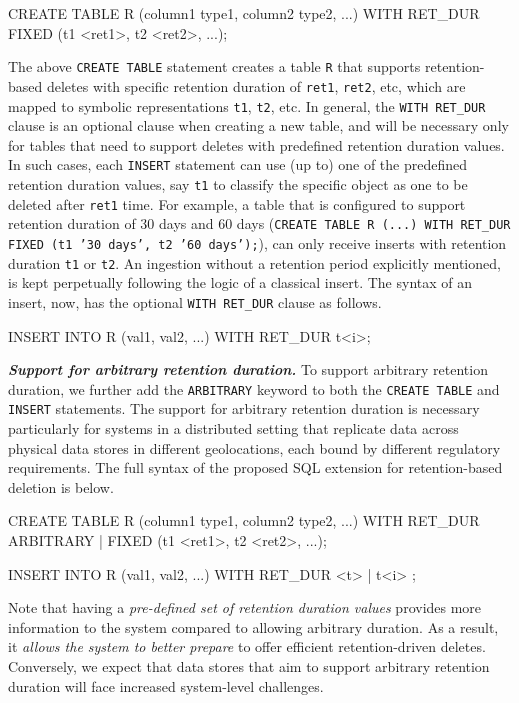 \documentclass[11pt,dvipdfmx]{article}
\newcommand\Paragraphbit[1]{\vspace{0.02in}  \noindent \textbf{\textit{#1.}}}
\begin{document}
\begin{verbnobox}[\fontsize{9pt}{10pt}\selectfont]
    CREATE TABLE R (column1 type1, column2 type2, ...) 
    WITH RET_DUR FIXED (t1 <ret1>, t2 <ret2>, ...);
\end{verbnobox}
The above \texttt{CREATE TABLE} statement creates a table \texttt{R} that supports 
retention-based deletes with specific retention duration of \texttt{ret1}, 
\texttt{ret2}, etc, which are mapped to symbolic representations \texttt{t1}, 
\texttt{t2}, etc.
In general, the \texttt{WITH RET\_DUR} clause is an optional clause when creating
a new table, and will be necessary only for tables that need to support deletes with 
predefined retention duration values. In such cases, each \texttt{INSERT} statement can use 
(up to) one of the predefined retention duration values, say \texttt{t1} to classify the 
specific object as one to be deleted after \texttt{ret1} time.
For example, a table that is configured to support retention duration of 30 days and 60 days (\texttt{CREATE TABLE R (...) WITH RET\_DUR FIXED (t1 '30 days', t2 '60 days');}), 
can only receive inserts with retention duration \texttt{t1} or \texttt{t2}.
An ingestion without a retention period explicitly mentioned, is kept perpetually 
following the logic of a classical insert. 
The syntax of an insert, now, has the 
optional \texttt{WITH RET\_DUR} clause as follows.
\begin{verbnobox}[\fontsize{9pt}{10pt}\selectfont]
 INSERT INTO R (val1, val2, ...) WITH RET_DUR t<i>;
\end{verbnobox}


\Paragraphbit{Support for arbitrary retention duration}
To support arbitrary retention duration, we further add the \texttt{ARBITRARY} 
keyword to both the \texttt{CREATE TABLE} and \texttt{INSERT} statements.
The support for arbitrary retention duration is necessary particularly for systems
in a distributed setting that replicate data across physical data stores in different 
geolocations, each bound by different regulatory requirements. 
The full syntax of the proposed SQL extension for retention-based deletion is below.
\begin{verbnobox}[\fontsize{9pt}{10pt}\selectfont]
 CREATE TABLE R (column1 type1, column2 type2, ...) 
 WITH RET_DUR {ARBITRARY | FIXED (t1 <ret1>, t2 <ret2>, ...)};
\end{verbnobox}
\begin{verbnobox}[\fontsize{9pt}{10pt}\selectfont]
 INSERT INTO R (val1, val2, ...) WITH RET_DUR { <t> | t<i> } ;
\end{verbnobox} 
Note that having a \emph{pre-defined set of retention duration values} provides more 
information to the system compared to allowing arbitrary duration. As a result, it 
\emph{allows the system to better prepare} to offer efficient retention-driven 
deletes. Conversely, we expect that data stores that aim to support arbitrary 
retention duration will face increased system-level challenges.
\end{document}
